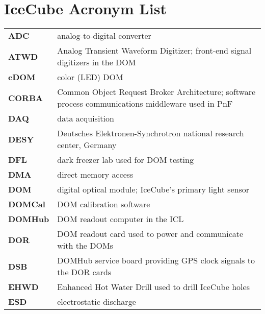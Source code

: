 

\section*{IceCube Acronym List}

\begin{longtable}{p{} p{}}

  \textbf{ADC} & analog-to-digital converter \\

  \textbf{ATWD} & Analog Transient Waveform Digitizer; front-end signal
  digitizers in the DOM \\

  \textbf{cDOM} & color (LED) DOM \\

  \textbf{CORBA} & Common Object Request Broker Architecture; software
  process communications middleware used in PnF \\
  
  \textbf{DAQ} & data acquisition \\

  \textbf{DESY} & Deutsches Elektronen-Synchrotron national research
  center, Germany \\
  
  \textbf{DFL} & dark freezer lab used for DOM testing \\

  \textbf{DMA} & direct memory access \\
  
  \textbf{DOM} & digital optical module; IceCube's primary light sensor \\

  \textbf{DOMCal} & DOM calibration software \\

  \textbf{DOMHub} & DOM readout computer in the ICL \\
  
  \textbf{DOR} & DOM readout card used to power and communicate with
  the DOMs \\

  \textbf{DSB} & DOMHub service board providing GPS clock signals to
  the DOR cards \\
  
  \textbf{EHWD} & Enhanced Hot Water Drill used to drill IceCube holes \\
  
  \textbf{ESD} & electrostatic discharge \\
  

\end{longtable}
